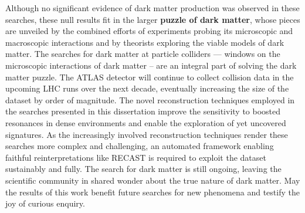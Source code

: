 Although no significant evidence of dark matter production was observed in these searches, these null results fit in the larger \textbf{puzzle of dark matter}, whose pieces are unveiled by the combined efforts of experiments probing its microscopic and macroscopic interactions and by theorists exploring the viable models of dark matter.
The searches for dark matter at particle colliders --- windows on the microscopic interactions of dark matter -- are an integral part of solving the dark matter puzzle. The ATLAS detector will continue to collect \HepProcess{\Pp\Pp} collision data in the upcoming LHC runs over the next decade, eventually increasing the size of the dataset by order of magnitude.
The novel reconstruction techniques employed in the searches presented in this dissertation improve the sensitivity to boosted resonances in dense environments and enable the exploration of yet uncovered signatures.
As the increasingly involved reconstruction techniques render these searches more complex and challenging, an automated framework enabling faithful reinterpretations like RECAST is required to exploit the dataset sustainably and fully.
The search for dark matter is still ongoing, leaving the scientific community in shared wonder about the true nature of dark matter. May the results of this work benefit future searches for new phenomena and testify the joy of curious enquiry.
